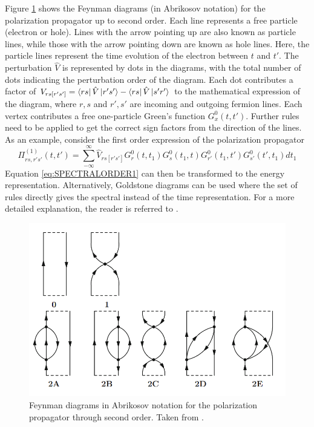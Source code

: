 Figure \ref{fig:POLPROP} shows the Feynman diagrams (in Abrikosov notation) for the polarization propagator up to second order. Each line represents a free particle (electron or hole). Lines with the arrow pointing up are also known as particle lines, while those with the arrow pointing down are known as hole lines. Here, the particle lines represent the time evolution of the electron between $t$ and $t'$. The perturbation $\hat{V}$ is represented by dots in the diagrams, with the total number of dots indicating the perturbation order of the diagram. Each dot contributes a factor of $V_{rs[r's']}=\bra{\smash{rs}}\hat{V}\ket{\smash{r's'}} - \bra{\smash{rs}}\hat{V}\ket{\smash{s'r'}}$ to the mathematical expression of the diagram, where $r,s$ and $r',s'$ are incoming and outgoing fermion lines. Each vertex contributes a free one-particle Green's function $G^0_x(t,t')$. Further rules need to be applied to get the correct sign factors from the direction of the lines. As an example, consider the first order expression of the polarization propagator
\begin{equation}
\Pi^{(1)}_{rs,r's'}(t,t') = \sum_{-\infty}^{\infty} \hat{V}_{rs[r's']}  G^{0}_r(t,t_1) G^0_s(t_1,t) G^0_{r'}(t_1,t') G_{s'}^0(t',t_1) dt_1
\label{eq:SPECTRALORDER1}
\end{equation}
\noindent Equation \ref{eq:SPECTRALORDER1} can then be transformed to the energy representation. Alternatively, Goldstone diagrams can be used where the set of rules directly gives the spectral instead of the time representation. For a more detailed explanation, the reader is referred to \cite{Sch2018}.

\begin{figure}
\centering
\includegraphics[scale=0.4]{Pics/POLPROP.png}
\caption[Feynman diagrams in Abrikosov notation for the polarization propagator through second order.]{Feynman diagrams in Abrikosov notation for the polarization propagator through second order. Taken from \cite{Sch2018}.}
\label{fig:POLPROP}
\end{figure}

